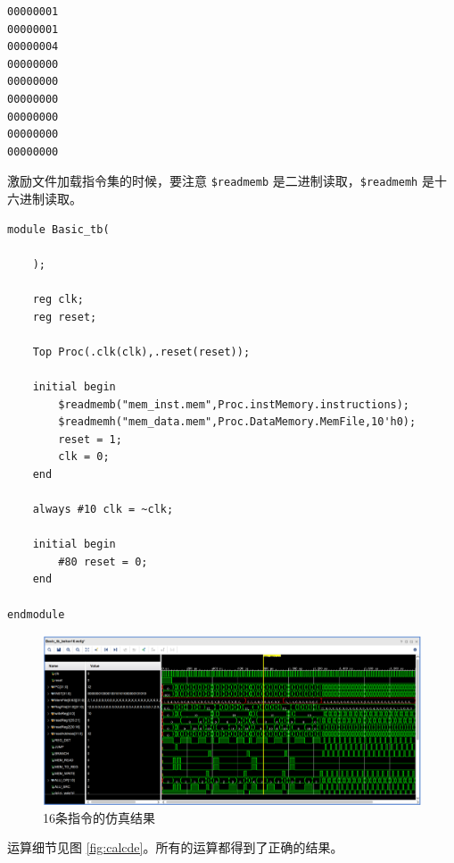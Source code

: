 \documentclass[a4paper,UTF8]{ctexart}
\begin{document}
\begin{lstlisting}[caption=mem\_data.mem]
00000001
00000001
00000004
00000000
00000000
00000000
00000000
00000000
00000000
\end{lstlisting}

激励文件加载指令集的时候，要注意 \verb"$readmemb" 是二进制读取，\verb"$readmemh" 是十六进制读取。

\begin{lstlisting}[caption=Basic\_tb.v]
module Basic_tb(

    );

    reg clk;
    reg reset;

    Top Proc(.clk(clk),.reset(reset));

    initial begin
        $readmemb("mem_inst.mem",Proc.instMemory.instructions);
        $readmemh("mem_data.mem",Proc.DataMemory.MemFile,10'h0);
        reset = 1;
        clk = 0;
    end

    always #10 clk = ~clk;

    initial begin
        #80 reset = 0;
    end

endmodule
\end{lstlisting}

\begin{figure}[h]
    \centering
    \includegraphics[width=\textwidth]{figure2.png}
    \caption{16条指令的仿真结果}
    \label{fig:16}
\end{figure}

运算细节见图 \ref{fig:calcde}。所有的运算都得到了正确的结果。
\end{document}
